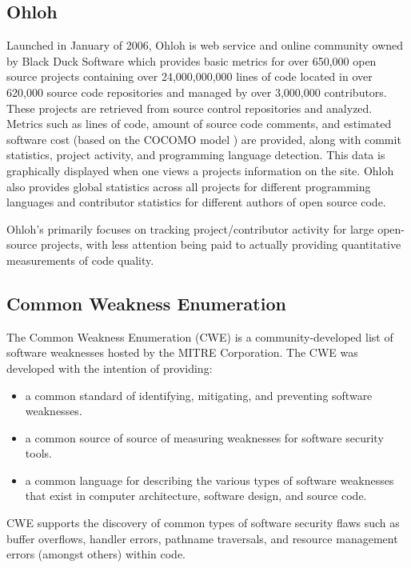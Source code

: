 \documentclass{sig-alternate}
\begin{document}
\subsection{Ohloh}
Launched in January of 2006, Ohloh \cite{allen2009ohloh} is web service and online community owned by Black Duck Software which provides basic metrics for over 650,000 open source projects containing over 24,000,000,000 lines of code located in over 620,000 source code repositories and managed by over 3,000,000 contributors. These projects are retrieved from source control repositories and analyzed. Metrics such as lines of code, amount of source code comments, and estimated software cost (based on the COCOMO model \cite{boehm2000software}) are provided, along with commit statistics, project activity, and programming language detection. This data is graphically displayed when one views a projects information on the site. Ohloh also provides global statistics across all projects for different programming languages and contributor statistics for different authors of open source code. 

Ohloh's primarily focuses on tracking project/contributor activity for large open-source projects, with less attention being paid to actually providing quantitative measurements of code quality.

\subsection{Common Weakness Enumeration}
The Common Weakness Enumeration (CWE) \cite{mitre2006cwe} is a community-developed list of software weaknesses hosted by the MITRE Corporation. The CWE was developed with the intention of providing:

\begin{itemize}
\item a common standard of identifying, mitigating, and preventing software weaknesses.
\item a common source of source of measuring weaknesses for software security tools.
\item a common language for describing the various types of software weaknesses that exist in computer architecture, software design, and source code.
\end{itemize}

CWE supports the discovery of common types of software security flaws such as buffer overflows, handler errors, pathname traversals, and resource management errors (amongst others) within code.
\end{document}
